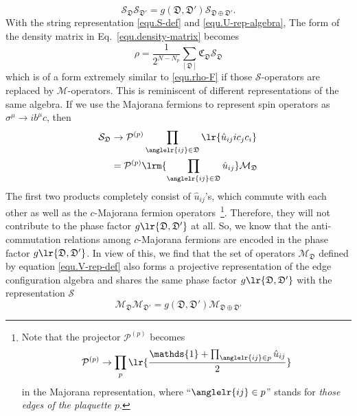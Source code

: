 \begin{equation}\label{equ.U-rep-algebra}
    \mathcal{S}_{\mathfrak{D}}\mathcal{S}_{\mathfrak{D}'} = g(\mathfrak{D},\mathfrak{D}')\mathcal{S}_{\mathfrak{D}\oplus\mathfrak{D}'}.
\end{equation}
With the string representation \eqref{equ.S-def} and \eqref{equ.U-rep-algebra}, The form of the density matrix in Eq.~\eqref{equ.density-matrix} becomes
\begin{equation}\label{equ.rho-U}
    \rho =  \frac{1}{2^{N-N_p}} \sum_{[\mathfrak{D}]}\mathfrak{C}_{\mathfrak{D}}\mathcal{S}_{\mathfrak{D}}
\end{equation}
which is of a form extremely similar to \eqref{equ.rho-F} if those $\mathcal{S}$-operators are replaced by $\mathcal{M}$-operators. This is reminiscent of different representations of the same algebra.
If we use the Majorana fermions to represent spin operators as $\sigma^\mu\to ib^\mu c$, then 
\begin{align*}
    \mathcal{S}_\mathfrak{D} &\to \mathcal{P}^{(p)} \prod_{\anglelr{ij}\in \mathfrak{D}}\lr{\hat{u}_{ij}ic_jc_i} \\
    &= \mathcal{P}^{(p)} \lrm{\prod_{\anglelr{ij}\in \mathfrak{D}}\hat{u}_{ij}} \mathcal{M}_{\mathfrak{D}}
\end{align*}
The first two products completely consist of $\hat{u}_{ij}$'s, which commute with each other as well as the $c$-Majorana fermion operators~\footnote{Note that the projector $\mathcal{P}^{(p)}$ becomes
\[\mathcal{P}^{(p)} \to \prod_{ p}\lr{\frac{\mathds{1} + \prod_{\anglelr{ij}\in p}\hat{u}_{ij}}{2}}\]
in the Majorana representation, where ``$\anglelr{ij}\in p$'' stands for \textit{those edges of the plaquette $p$}.}. Therefore, they will not contribute to the phase factor $g\lr{\mathfrak{D},\mathfrak{D}'}$ at all. So, we know that the anti-commutation relations among $c$-Majorana fermions are encoded in the phase factor $g\lr{\mathfrak{D},\mathfrak{D}'}$. In view of this, we find that the set of operators $\mathcal{M}_\mathfrak{D}$ defined by equation \eqref{equ.V-rep-def} also forms a projective representation of the edge configuration algebra and shares the same phase factor $g\lr{\mathfrak{D},\mathfrak{D}'}$ with the representation $\mathcal{S}$
\begin{equation}\label{equ.V-rep-algebra}
    \mathcal{M}_{\mathfrak{D}}\mathcal{M}_{\mathfrak{D}'} = g(\mathfrak{D},\mathfrak{D}')\mathcal{M}_{\mathfrak{D}\oplus\mathfrak{D}'}
\end{equation}
